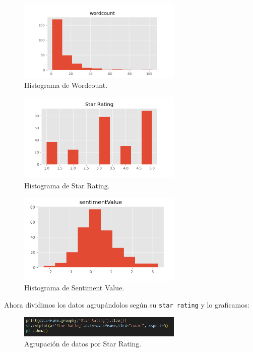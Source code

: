 \documentclass{article}
\begin{document}
\begin{figure}[H]
    \centering
    \includegraphics[width=0.7\textwidth]{img/6.png}
    \caption{Histograma de Wordcount.}
\end{figure}

\begin{figure}[H]
    \centering
    \includegraphics[width=0.7\textwidth]{img/7.png}
    \caption{Histograma de Star Rating.}
\end{figure}

\begin{figure}[H]
    \centering
    \includegraphics[width=0.7\textwidth]{img/8.png}
    \caption{Histograma de Sentiment Value.}
\end{figure}

Ahora dividimos los datos agrupándolos según su \texttt{star rating} y lo graficamos:

\begin{figure}[H]
    \centering
    \includegraphics[width=0.7\textwidth]{img/9.png}
    \caption{Agrupación de datos por Star Rating.}
\end{figure}
\end{document}
